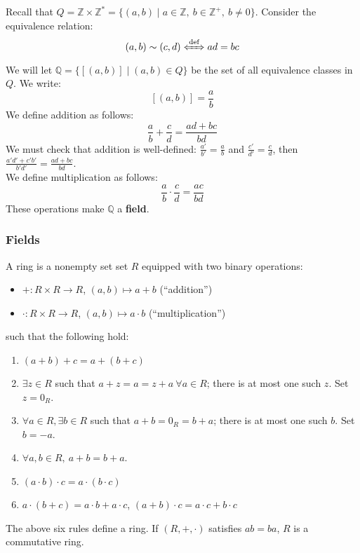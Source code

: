 \documentclass[10pt]{extarticle}
\newcommand{\Q}{\mathbb{Q}}
\newcommand{\Z}{\mathbb{Z}}
\begin{document}
    Recall that $Q = \Z \times \Z^* = \{(a,b) \mid a\in \Z,~b\in \Z^{+},~b\neq 0\}$. Consider the equivalence relation:
      \[
        (a,b)\sim(c,d) \xLeftrightarrow{\text{def}} ad = bc
      \] 
      We will let $\Q = \{[(a,b)]\mid (a,b) \in Q\}$ be the set of all equivalence classes in $Q$. We write:
      \[
        [(a,b)] = \frac{a}{b}
      \] 
      We define addition as follows:
      \[
        \frac{a}{b} + \frac{c}{d} = \frac{ad + bc}{bd}
      \] 
      We must check that addition is well-defined: $\frac{a'}{b'} = \frac{a}{b}$ and $\frac{c'}{d'} = \frac{c}{d}$, then $\frac{a'd' + c'b'}{b'd'} = \frac{ad+bc}{bd}$.\\

      We define multiplication as follows:
      \[
        \frac{a}{b} \cdot \frac{c}{d} = \frac{ac}{bd}
      \] 
      These operations make $\Q$ a \textbf{field}.
      \subsubsection{Fields}%
        A ring is a nonempty set set $R$ equipped with two binary operations:
        \begin{itemize}
          \item $+: R\times R \rightarrow R$, $(a,b) \mapsto a+b$ (``addition'')
          \item $\cdot: R\times R \rightarrow R$, $(a,b) \mapsto a\cdot b$ (``multiplication'')
        \end{itemize}
        such that the following hold:
        \begin{enumerate}[(1)]
          \item $(a+b)+c = a+(b+c)$
          \item $\exists z\in R$ such that $a+z = a = z+a~\forall a\in R$; there is at most one such $z$. Set $z = 0_R$.
          \item $\forall a\in R,\exists b\in R$ such that $a+b = 0_R = b+a$; there is at most one such $b$. Set $b = -a$.
          \item $\forall a,b\in R,~a+b = b+a$.
          \item $(a\cdot b)\cdot c = a\cdot(b\cdot c)$
          \item $a\cdot(b+c) = a\cdot b + a\cdot c$, $(a+b)\cdot c = a\cdot c + b\cdot c$
        \end{enumerate}
        The above six rules define a ring. If $(R,+,\cdot)$ satisfies $ab = ba$, $R$ is a commutative ring.\\
\end{document}
